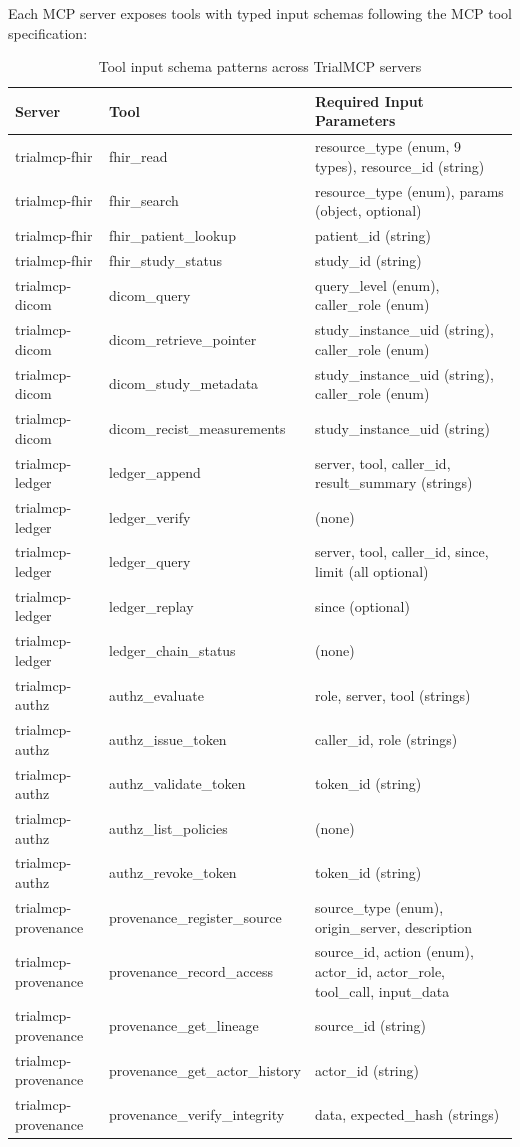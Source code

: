 \documentclass[10pt,letterpaper]{article}
\begin{document}
Each MCP server exposes tools with typed input schemas following the MCP tool specification:

\begin{table}[H]
\centering
\caption{Tool input schema patterns across TrialMCP servers}
\label{tab:schemas}
\small
\begin{tabularx}{\textwidth}{l l X}
\toprule
\textbf{Server} & \textbf{Tool} & \textbf{Required Input Parameters} \\
\midrule
trialmcp-fhir & fhir\_read & resource\_type (enum, 9 types), resource\_id (string) \\
trialmcp-fhir & fhir\_search & resource\_type (enum), params (object, optional) \\
trialmcp-fhir & fhir\_patient\_lookup & patient\_id (string) \\
trialmcp-fhir & fhir\_study\_status & study\_id (string) \\
\midrule
trialmcp-dicom & dicom\_query & query\_level (enum), caller\_role (enum) \\
trialmcp-dicom & dicom\_retrieve\_pointer & study\_instance\_uid (string), caller\_role (enum) \\
trialmcp-dicom & dicom\_study\_metadata & study\_instance\_uid (string), caller\_role (enum) \\
trialmcp-dicom & dicom\_recist\_measurements & study\_instance\_uid (string) \\
\midrule
trialmcp-ledger & ledger\_append & server, tool, caller\_id, result\_summary (strings) \\
trialmcp-ledger & ledger\_verify & (none) \\
trialmcp-ledger & ledger\_query & server, tool, caller\_id, since, limit (all optional) \\
trialmcp-ledger & ledger\_replay & since (optional) \\
trialmcp-ledger & ledger\_chain\_status & (none) \\
\midrule
trialmcp-authz & authz\_evaluate & role, server, tool (strings) \\
trialmcp-authz & authz\_issue\_token & caller\_id, role (strings) \\
trialmcp-authz & authz\_validate\_token & token\_id (string) \\
trialmcp-authz & authz\_list\_policies & (none) \\
trialmcp-authz & authz\_revoke\_token & token\_id (string) \\
\midrule
trialmcp-provenance & provenance\_register\_source & source\_type (enum), origin\_server, description \\
trialmcp-provenance & provenance\_record\_access & source\_id, action (enum), actor\_id, actor\_role, tool\_call, input\_data \\
trialmcp-provenance & provenance\_get\_lineage & source\_id (string) \\
trialmcp-provenance & provenance\_get\_actor\_history & actor\_id (string) \\
trialmcp-provenance & provenance\_verify\_integrity & data, expected\_hash (strings) \\
\bottomrule
\end{tabularx}
\end{table}
\end{document}
